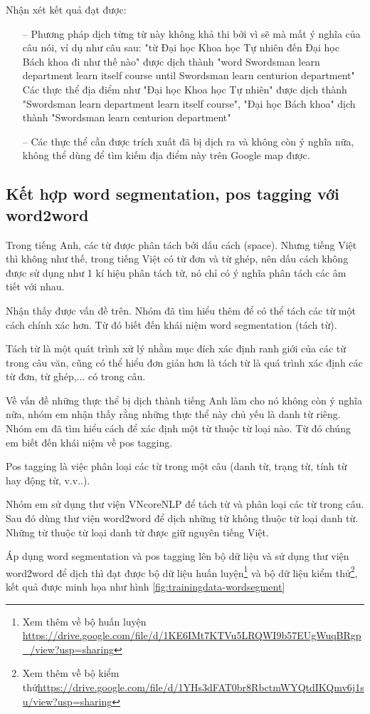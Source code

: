 Nhận xét kết quả đạt được:
\begin{itemize}
    \item[--] Phương pháp dịch từng từ này không khả thi bởi vì sẽ mà mất ý nghĩa của câu nói, ví dụ như câu sau: "từ Đại học Khoa học Tự nhiên đến Đại học Bách khoa đi như thế nào" được dịch thành "word Swordsman learn department learn itself course until Swordsman learn centurion department" Các thực thể địa điểm như "Đại học Khoa học Tự nhiên" được dịch thành "Swordsman learn department learn itself course", "Đại học Bách khoa" dịch thành "Swordsman learn centurion department"
    \item[--] Các thực thể cần được trích xuất đã bị dịch ra và không còn ý nghĩa nữa, không thể dùng để tìm kiếm địa điểm này trên Google map được.
\end{itemize}
\subsection{Kết hợp word segmentation, pos tagging với word2word}

Trong tiếng Anh, các từ được phân tách bởi dấu cách (space). Nhưng tiếng Việt thì không như thế, trong tiếng Việt có từ đơn và từ ghép, nên dấu cách không được sử dụng như 1 kí hiệu phân tách từ, nó chỉ có ý nghĩa phân tách các âm tiết với nhau. 

Nhận thấy được vấn đề trên. Nhóm đã tìm hiểu thêm để có thể tách các từ một cách chính xác hơn. Từ đó biết đến khái niệm word segmentation (tách từ). 

Tách từ là một quát trình xử lý nhằm mục đích xác định ranh giới của các từ trong câu văn, cũng có thể hiểu đơn giản hơn là tách từ là quá trình xác định các từ đơn, từ ghép,... có trong câu.

Về vấn đề những thực thể bị dịch thành tiếng Anh làm cho nó không còn ý nghĩa nữa, nhóm em nhận thấy rằng những thực thể này chủ yếu là danh từ riêng. Nhóm em đã tìm hiểu  cách để xác định một từ thuộc từ loại nào. Từ đó chúng em biết đến khái niệm về pos tagging.

Pos tagging là việc phân loại các từ trong một câu (danh từ, trạng từ, tính từ hay động từ, v.v..).

Nhóm em sử dụng thư viện VNcoreNLP để tách từ và phân loại các từ trong câu. Sau đó dùng thư viện word2word để dịch những từ không thuộc từ loại danh từ. Những từ thuộc từ loại danh từ được giữ nguyên tiếng Việt.


Áp dụng word segmentation và pos tagging lên bộ dữ liệu và sử dụng thư viện word2word để dịch thì đạt được bộ dữ liệu huấn luyện\footnote{Xem thêm về bộ huấn luyện \url{https://drive.google.com/file/d/1KE6IMt7KTVu5LRQWI9b57EUgWuqBRgp_/view?usp=sharing}} và bộ dữ liệu kiểm thử\footnote{Xem thêm về bộ kiểm thử\url{https://drive.google.com/file/d/1YHs3dFAT0br8RbctmWYQtdIKQmv6j1su/view?usp=sharing}}, kết quả được minh họa như hình \ref{fig:trainingdata-wordsegment}

